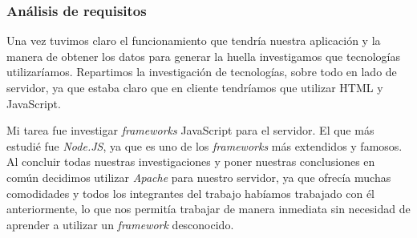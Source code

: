 \subsubsection{Análisis de requisitos}
Una vez tuvimos claro el funcionamiento que tendría nuestra aplicación y la manera de obtener los datos para generar la huella investigamos que tecnologías utilizaríamos. Repartimos la investigación de tecnologías, sobre todo en lado de servidor, ya que estaba claro que en cliente tendríamos que utilizar HTML y JavaScript.\par
Mi tarea fue investigar \textit{frameworks} JavaScript para el servidor. El que más estudié fue \textit{Node.JS}\cite{nodejs}, ya que es uno de los \textit{frameworks} más extendidos y famosos. Al concluir todas nuestras investigaciones y poner nuestras conclusiones en común decidimos utilizar \textit{Apache} para nuestro servidor, ya que ofrecía muchas comodidades y todos los integrantes del trabajo habíamos trabajado con él anteriormente, lo que nos permitía trabajar de manera inmediata sin necesidad de aprender a utilizar un \textit{framework} desconocido.
